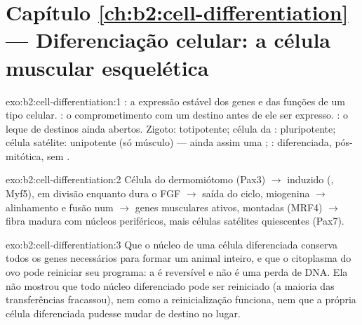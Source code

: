 \section*{Capítulo \ref{ch:b2:cell-differentiation} --- Diferenciação celular: a célula muscular esquelética}

\begin{solution}{exo:b2:cell-differentiation:1}
: a expressão estável dos genes e das funções de um tipo
celular. : o comprometimento com um destino antes de ele
ser expresso. : o leque de destinos ainda abertos. Zigoto:
totipotente; célula da : pluripotente; célula
satélite: unipotente (só músculo) --- ainda assim uma ;
: diferenciada, pós-mitótica, sem .
\end{solution}

\begin{solution}{exo:b2:cell-differentiation:2}
Célula do dermomiótomo (Pax3) $\to$  induzido (, Myf5),
em divisão enquanto dura o FGF $\to$ saída do ciclo, miogenina $\to$
alinhamento e fusão num  $\to$ genes musculares ativos,
 montadas (MRF4) $\to$ fibra madura com núcleos periféricos,
mais células satélites quiescentes (Pax7).
\end{solution}

\begin{solution}{exo:b2:cell-differentiation:3}
Que o núcleo de uma célula diferenciada conserva todos os genes
necessários para formar um animal inteiro, e que o citoplasma do ovo
pode reiniciar seu programa: a  é reversível e não é uma
perda de DNA. Ela não mostrou que todo núcleo diferenciado pode ser
reiniciado (a maioria das transferências fracassou), nem como a
reinicialização funciona, nem que a própria célula diferenciada
pudesse mudar de destino no lugar.
\end{solution}

